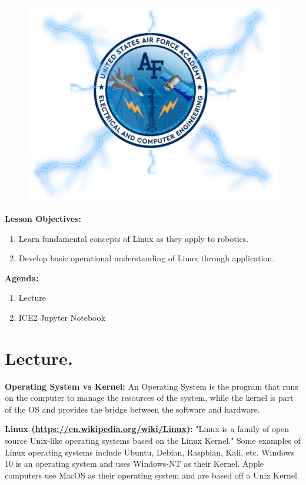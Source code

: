 \documentclass{handout}
\begin{document}
\maketitle

\begin{figure}[H]
	\centering
	\includegraphics[width=.75\textwidth]{Cover.PNG}
\end{figure}

\textbf{Lesson Objectives:}
\begin{enumerate} \setlength\itemsep{0em}
	\item Learn fundamental concepts of Linux as they apply to robotics.
	\item Develop basic operational understanding of Linux through application.
\end{enumerate}

\textbf{Agenda:}
\begin{enumerate} \setlength\itemsep{0em}
	\item Lecture
	\item ICE2 Jupyter Notebook
\end{enumerate}

\newpage
\clearpage
\pagebreak

\section{Lecture.}
\textbf{Operating System vs Kernel:}
An Operating System is the program that runs on the computer to manage the resources of the system, while the kernel is part of the OS and provides the bridge between the software and hardware.

\textbf{Linux (\url{https://en.wikipedia.org/wiki/Linux}):} "Linux is a family of open source Unix-like operating systems based on the Linux Kernel." Some examples of Linux operating systems include Ubuntu, Debian, Raspbian, Kali, etc. Windows 10 is an operating system and uses Windows-NT as their Kernel. Apple computers use MacOS as their operating system and are based off a Unix Kernel.
\end{document}
